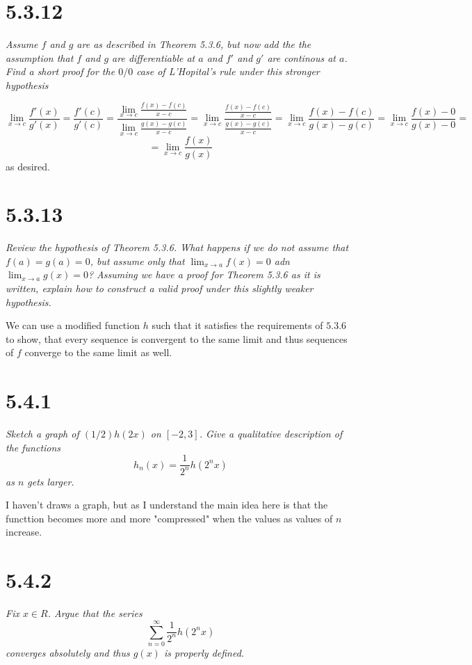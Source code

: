 \documentclass[11pt,oneside,titlepage]{book}
\begin{document}
\section*{5.3.12}
\textit{Assume $f$ and $g$ are as described in Theorem 5.3.6, but now add the
  the assumption that $f$ and $g$ are differentiable at $a$ and $f'$ and $g'$
  are continous at $a$. Find a short proof for the $0/0$ case of L'Hopital's
  rule under this stronger hypothesis}

$$\lim_{x \to c}\frac{f'(x)}{g'(x)} = \frac{f'(c)}{g'(c)} =
\frac{\lim_{x \to c}\frac{f(x) - f(c)}{x - c}}
{\lim_{x \to c}\frac{g(x) - g(c)}{x - c}} =
\lim_{x \to c} \frac{\frac{f(x) - f(c)}{x - c}}
{\frac{g(x) - g(c)}{x - c}} =
\lim_{x \to c} \frac{f(x) - f(c)} {g(x) - g(c)} =
\lim_{x \to c} \frac{f(x) - 0} {g(x) - 0} =$$
$$ = \lim_{x \to c} \frac{f(x)} {g(x)}$$
as desired.

\section*{5.3.13}
\textit{Review the hypothesis of Theorem 5.3.6. What happens if we do not
  assume that $f(a) = g(a) = 0$, but assume only that $\lim_{x \to a}f(x) = 0$
  adn $\lim_{x \to a} g(x) = 0$? Assuming we have a proof for Theorem 5.3.6
  as it is written, explain how to construct a valid proof under this
  slightly weaker hypothesis.}

We can use a modified function $h$ such that it satisfies the requirements of
$5.3.6$ to show, that every sequence is convergent to the same limit and thus
sequences of $f$ converge to the same limit as well.


\section*{5.4.1}

\textit{Sketch a graph of $(1/2)h(2x)$ on $[-2, 3]$. Give a qualitative
  description of the functions}
$$h_n(x) = \frac{1}{2^n}h(2^nx)$$
\textit{as $n$ gets larger.}

I haven't draws a graph, but as I understand the main idea here is that the
functtion becomes more and more "compressed" when the values as values
of $n$ increase.

\section*{5.4.2}
\textit{Fix $x \in R$. Argue that the series}
$$\sum_{n = 0}^{\infty}{\frac{1}{2^n}h(2^nx)}$$
\textit{converges absolutely and thus $g(x)$ is properly defined.}
\end{document}
